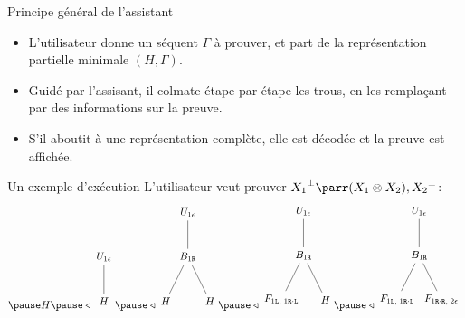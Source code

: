 \documentclass{beamer}
\newcommand*{\orth}{^\perp}
\newcommand*{\tensor}{\otimes}
\newcommand*{\sequent}{\Gamma}
\newcommand*{\Left}{\textnormal{\texttt{L}}}
\newcommand*{\Right}{\textnormal{\texttt{R}}}
\newcommand*{\relapprox}{\ensuremath{\triangleleft}}
\newcommand*{\unknown}{H}
\begin{document}
\begin{frame}{Principe général de l'assistant}
    \begin{itemize}
        \item L'utilisateur donne un séquent $\sequent$ à prouver, et part de la représentation partielle minimale $(\unknown, \sequent)$.
            \pause
        \item Guidé par l'assisant, il colmate étape par étape les trous, en les remplaçant par des informations sur la preuve.
            \pause
        \item S'il aboutit à une représentation complète, elle est décodée et la preuve est affichée.
    \end{itemize}
\end{frame}

\begin{frame}{Un exemple d'exécution}
    L'utilisateur veut prouver ${X_1}\orth \parr (X_1 \tensor X_2), {X_2}\orth$:
        \pause \\
    \begin{equation*}
    \pause
    \unknown 
    \pause
    \relapprox
    \begin{tikzpicture}%
        [level 2/.style={sibling distance=3.5cm}]
        \node {$U_{1 \epsilon}$}
        child {node {$\unknown$}
        };
    \end{tikzpicture}
    \pause
    \relapprox
    \begin{tikzpicture}%
        [level 2/.style={sibling distance=1.5cm}]
        \node {$U_{1 \epsilon}$}
        child {node {$B_{1 \Right}$}
            child {node {$\unknown$}}
            child {node {$\unknown$}}
        };
    \end{tikzpicture}
    \pause
    \relapprox
    \begin{tikzpicture}%
        [level 2/.style={sibling distance=1.5cm}]
        \node {$U_{1 \epsilon}$}
        child {node {$B_{1 \Right}$}
            child {node {$F_{1 \Left, \; 1 \Right \cdot \Left}$}}
            child {node {$\unknown$}}
        };
    \end{tikzpicture}
    \pause
    \relapprox
    \begin{tikzpicture}%
        [level 2/.style={sibling distance=1.5cm}]
        \node {$U_{1 \epsilon}$}
        child {node {$B_{1 \Right}$}
            child {node {$F_{1 \Left, \; 1 \Right \cdot \Left}$}}
            child {node {$F_{1 \Right \cdot \Right, \; 2 \epsilon}$}}
        };
    \end{tikzpicture}
    \end{equation*}
\end{frame}
\end{document}
